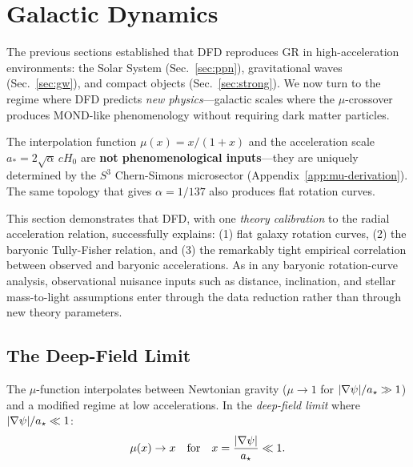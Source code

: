 
\section{Galactic Dynamics}\label{sec:galactic}

The previous sections established that DFD reproduces GR in high-acceleration environments: the Solar System (Sec.~\ref{sec:ppn}), gravitational waves (Sec.~\ref{sec:gw}), and compact objects (Sec.~\ref{sec:strong}). We now turn to the regime where DFD predicts \textit{new physics}---galactic scales where the $\mu$-crossover produces MOND-like phenomenology without requiring dark matter particles.

\begin{tcolorbox}[colback=blue!5!white, colframe=blue!60!black, title=Key Result: $\mu(x)$ Derived from Topology]
The interpolation function $\mu(x) = x/(1+x)$ and the acceleration scale $a_* = 2\sqrt{\alpha}\,cH_0$ are \textbf{not phenomenological inputs}---they are uniquely determined by the $S^3$ Chern-Simons microsector (Appendix~\ref{app:mu-derivation}). The same topology that gives $\alpha = 1/137$ also produces flat rotation curves.
\end{tcolorbox}

This section demonstrates that DFD, with one \emph{theory calibration} to the radial acceleration relation, successfully explains: (1) flat galaxy rotation curves, (2) the baryonic Tully-Fisher relation, and (3) the remarkably tight empirical correlation between observed and baryonic accelerations.  As in any baryonic rotation-curve analysis, observational nuisance inputs such as distance, inclination, and stellar mass-to-light assumptions enter through the data reduction rather than through new theory parameters.

\subsection{The Deep-Field Limit}\label{sec:galactic-deep}

The $\mu$-function interpolates between Newtonian gravity ($\mu \to 1$ for $|\nabla\psi|/a_\star \gg 1$) and a modified regime at low accelerations. In the \textit{deep-field limit} where $|\nabla\psi|/a_\star \ll 1$:
\begin{equation}\label{eq:mu-deep}
\mu(x) \to x \quad \text{for} \quad x = \frac{|\nabla\psi|}{a_\star} \ll 1.
\end{equation}

